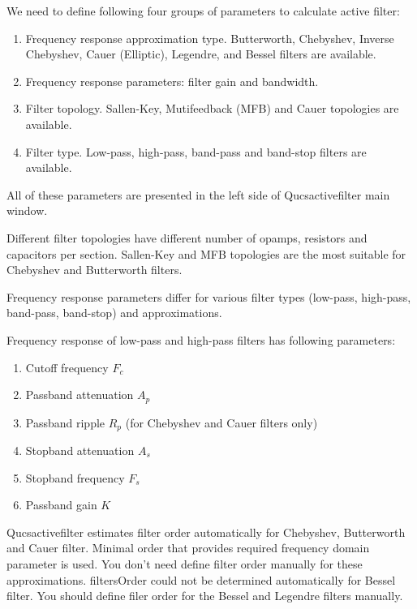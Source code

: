 
We need to define following four groups of parameters to calculate active
filter:

\begin{enumerate}
 \item Frequency response approximation type. Butterworth, Chebyshev,
Inverse Chebyshev,  Cauer (Elliptic), Legendre, and Bessel filters are 
available.
 \item Frequency response parameters: filter gain and bandwidth.
 \item Filter topology. Sallen-Key, Mutifeedback (MFB) and Cauer topologies are
available.
 \item Filter type. Low-pass, high-pass, band-pass and band-stop filters are
available.
\end{enumerate}

All of these parameters are presented in the left side of Qucsactivefilter main
window.

Different filter topologies have different number of opamps, resistors and
capacitors per section. Sallen-Key and MFB topologies are the most suitable for
Chebyshev and Butterworth filters.

Frequency response parameters differ for various filter types (low-pass,
high-pass, band-pass, band-stop) and approximations.


Frequency response of low-pass and high-pass filters has following
parameters:

\begin{enumerate}
 \item Cutoff frequency $F_c$
 \item Passband attenuation $A_p$
 \item Passband ripple $R_p$ (for Chebyshev and Cauer filters only)
 \item Stopband attenuation $A_s$
 \item Stopband frequency $F_s$
 \item Passband gain $K$
\end{enumerate}

Qucsactivefilter estimates filter order automatically for Chebyshev,
Butterworth and Cauer filter. Minimal order that provides required frequency
domain parameter is used. You don't need define filter order manually for these
approximations. filtersOrder could not be determined automatically for Bessel
filter. You should
define filer order for the Bessel and Legendre filters manually.

